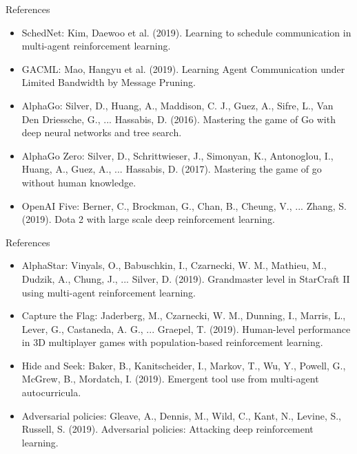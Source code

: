 \documentclass{beamer}
\begin{document}
\begin{frame}{References}
    \begin{itemize}
    \item SchedNet: Kim, Daewoo et al. (2019). Learning to schedule communication in multi-agent reinforcement learning.
    \item GACML: Mao, Hangyu et al. (2019). Learning Agent Communication under Limited Bandwidth by Message Pruning.
    \item AlphaGo: Silver, D., Huang, A., Maddison, C. J., Guez, A., Sifre, L., Van Den Driessche, G., ... Hassabis, D. (2016). Mastering the game of Go with deep neural networks and tree search.
    \item AlphaGo Zero: Silver, D., Schrittwieser, J., Simonyan, K., Antonoglou, I., Huang, A., Guez, A., ... Hassabis, D. (2017). Mastering the game of go without human knowledge.
    \item OpenAI Five: Berner, C., Brockman, G., Chan, B., Cheung, V., ... Zhang, S. (2019). Dota 2 with large scale deep reinforcement learning. 
    \end{itemize}
\end{frame}

\begin{frame}{References}
    \begin{itemize}
     \item AlphaStar: Vinyals, O., Babuschkin, I., Czarnecki, W. M., Mathieu, M., Dudzik, A., Chung, J., ... Silver, D. (2019). Grandmaster level in StarCraft II using multi-agent reinforcement learning. 
     \item Capture the Flag: Jaderberg, M., Czarnecki, W. M., Dunning, I., Marris, L., Lever, G., Castaneda, A. G., ...  Graepel, T. (2019). Human-level performance in 3D multiplayer games with population-based reinforcement learning.
     \item Hide and Seek: Baker, B., Kanitscheider, I., Markov, T., Wu, Y., Powell, G., McGrew, B., Mordatch, I. (2019). Emergent tool use from multi-agent autocurricula. 
     \item Adversarial policies: Gleave, A., Dennis, M., Wild, C., Kant, N., Levine, S.,  Russell, S. (2019). Adversarial policies: Attacking deep reinforcement learning. 
    \end{itemize}
\end{frame}
\end{document}
